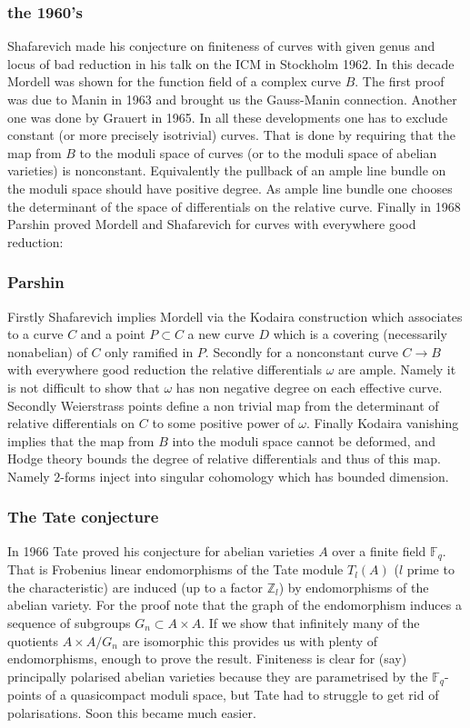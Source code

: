 \documentclass{beamer}
\begin{document}
\begin{frame}
\frametitle{the 1960's}
 Shafarevich made his conjecture on finiteness of curves with given genus and locus of bad reduction in his talk on the ICM in Stockholm 1962.
In this decade Mordell was shown for the function field of a complex curve $B$. The first proof was due to Manin in 1963 and brought us the Gauss-Manin connection. Another one was done by Grauert in 1965.  In all these developments one has to exclude constant (or more precisely isotrivial) curves. That is done by requiring that the map from $B$ to the moduli space of curves (or to the moduli space of abelian varieties) is nonconstant. Equivalently the pullback of an ample line bundle on the moduli space should have positive degree. As ample line bundle one chooses the determinant of the space of differentials on the relative curve. Finally in 1968 Parshin proved Mordell and Shafarevich for curves with everywhere good reduction:

\end{frame}
\begin{frame}
\frametitle{Parshin}
Firstly Shafarevich implies Mordell via the Kodaira construction which associates to a curve $C$ and a point $P \subset C$ a new curve $D$ which is a covering (necessarily nonabelian) of $C$ only ramified in $P$. Secondly for a nonconstant curve $C \rightarrow B$ with everywhere good reduction the relative differentials $\omega$ are ample. Namely it is not difficult to show that $\omega$ has non negative degree on each effective curve. Secondly Weierstrass points define a non trivial map from the determinant of relative differentials on $C$ to some positive power of $\omega$. Finally Kodaira vanishing implies that the map from $B$ into the moduli space cannot be deformed, and Hodge theory bounds the degree of relative differentials and thus of this map. Namely $2$-forms inject into singular cohomology which has bounded dimension.
\end{frame}
\begin{frame}
\frametitle{The Tate conjecture}
In 1966 Tate proved his conjecture for abelian varieties $A$ over a finite field $\mathbb{F}_q$. That is Frobenius linear endomorphisms of the Tate module $T_l(A)$ ($l$ prime to the characteristic) are induced (up to a factor $\mathbb{Z}_l$) by endomorphisms of the abelian variety. For the proof note that the graph of the endomorphism induces a sequence of subgroups $G_n \subset A \times A$. If we show that infinitely many of the quotients $A \times A/G_n$ are isomorphic this provides us with plenty of endomorphisms, enough to prove the result. Finiteness is clear for (say) principally polarised abelian varieties because they are parametrised by the $\mathbb{F}_q$-points of a quasicompact moduli space, but Tate had to struggle to get rid of polarisations. Soon this became much easier.
\end{frame}
\end{document}

